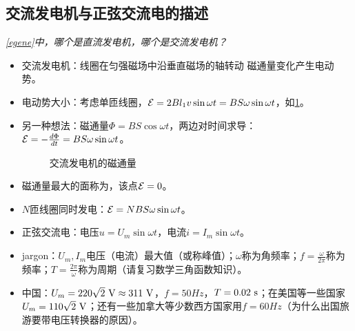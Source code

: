 \documentclass[a4paper,9pt]{ctexart}
\newcommand{\emf}{{\cal E}}
\begin{document}
\subsection{交流发电机与正弦交流电的描述}
\emph{\cref{egene}中，哪个是直流发电机，哪个是交流发电机？}
\begin{itemize}
\item
交流发电机：线圈在匀强磁场中沿垂直磁场的轴转动 \so 磁通量变化产生电动势。
\item
电动势大小：考虑单匝线圈，$\emf = 2Bl_1 v\sin \omega t =BS\omega \sin \omega t$，如\cref{acgen}。
\item
另一种想法：磁通量$\Phi = BS\cos \omega t$，两边对时间求导：$\emf = -\frac{d\Phi}{dt} = BS \omega \sin \omega t$。
\begin{figure}[H]
\centering
{}
\caption{交流发电机的磁通量\label{acgen}}
\end{figure}
\item
磁通量最大的面称为，该点$\emf=0$。
\item
$N$匝线圈同时发电：$\emf = NBS\omega \sin \omega t$。
\item
正弦交流电：电压$u = U_m \sin \omega t$，电流$i = I_m \sin \omega t$。
\item
jargon：$U_m,I_m$电压（电流）最大值（或称峰值）；$\omega$称为角频率；$f = \frac{\omega}{2\pi}$称为频率；$T = \frac{2\pi}{\omega}$称为周期（请复习数学三角函数知识）。
\item
中国：$U_m = 220\sqrt 2 {\rm \ V} \approx 311{\rm \ V}$，$f = 50\unit{Hz}$，$T = 0.02{\rm \ s}$；在美国等一些国家$U_m = 110\sqrt 2 {\rm \ V}$；还有一些加拿大等少数西方国家用$f = 60\unit{Hz}$（为什么出国旅游要带电压转换器的原因）。
\end{itemize}
\end{document}
